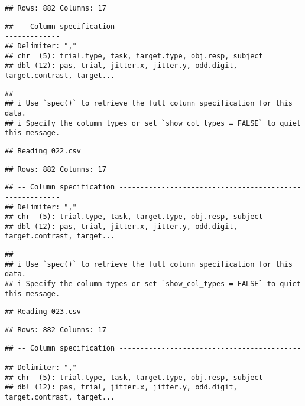 \documentclass[
]{article}
\begin{document}
\begin{verbatim}
## Rows: 882 Columns: 17
\end{verbatim}

\begin{verbatim}
## -- Column specification --------------------------------------------------------
## Delimiter: ","
## chr  (5): trial.type, task, target.type, obj.resp, subject
## dbl (12): pas, trial, jitter.x, jitter.y, odd.digit, target.contrast, target...
\end{verbatim}

\begin{verbatim}
## 
## i Use `spec()` to retrieve the full column specification for this data.
## i Specify the column types or set `show_col_types = FALSE` to quiet this message.
\end{verbatim}

\begin{verbatim}
## Reading 022.csv
\end{verbatim}

\begin{verbatim}
## Rows: 882 Columns: 17
\end{verbatim}

\begin{verbatim}
## -- Column specification --------------------------------------------------------
## Delimiter: ","
## chr  (5): trial.type, task, target.type, obj.resp, subject
## dbl (12): pas, trial, jitter.x, jitter.y, odd.digit, target.contrast, target...
\end{verbatim}

\begin{verbatim}
## 
## i Use `spec()` to retrieve the full column specification for this data.
## i Specify the column types or set `show_col_types = FALSE` to quiet this message.
\end{verbatim}

\begin{verbatim}
## Reading 023.csv
\end{verbatim}

\begin{verbatim}
## Rows: 882 Columns: 17
\end{verbatim}

\begin{verbatim}
## -- Column specification --------------------------------------------------------
## Delimiter: ","
## chr  (5): trial.type, task, target.type, obj.resp, subject
## dbl (12): pas, trial, jitter.x, jitter.y, odd.digit, target.contrast, target...
\end{verbatim}
\end{document}
